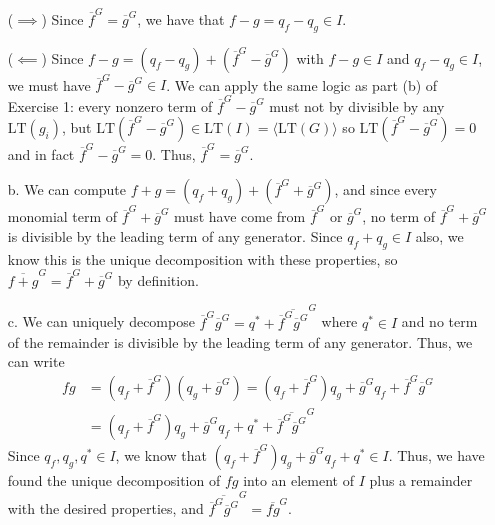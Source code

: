 \documentclass[12pt]{amsart}
\theoremstyle{definition}
\begin{document}
\begin{flushleft}
\begin{enumerate}
    ($\implies$) Since $\overline f^G = \overline g^G$, we have that $f-g=q_f-q_g \in I$.

    ($\impliedby$) Since $f-g = (q_f - q_g) +\left(\overline f^G - \overline g^G \right)$ with $f-g \in I$ and $q_f - q_g \in I$, we must have $\overline f^G - \overline g^G \in I$. We can apply the same logic as part (b) of Exercise 1: every nonzero term of $\overline f^G-\overline g^G$ must not by divisible by any $\text{LT}(g_i)$, but $\text{LT}\left(\overline f^G -\overline g^G \right) \in \text{LT}(I)=\langle \text{LT}(G)\rangle$ so $\text{LT}\left(\overline f^G -\overline g^G \right)=0$ and in fact $\overline f^G - \overline g^G = 0$. Thus, $\overline f^G = \overline g^G$.
    \item[b.] %
    We can compute $f+g=(q_f + q_g)+ \left(\overline f^G+\overline g^G\right)$, and since every monomial term of $\overline f^G + \overline g^G$ must have come from $\overline f^G$ or $\overline g^G$, no term of $\overline f^G + \overline g^G$ is divisible by the leading term of any generator. Since $q_f+q_g \in I$ also, we know this is the unique decomposition with these properties, so $\overline{f+g}^G = \overline f^G + \overline g^G$ by definition.
    \item[c.] We can uniquely decompose $\overline f^G \overline g^G = q^\ast + \overline{\overline f^G \overline g^G}^G$ where $q^\ast \in I$ and no term of the remainder is divisible by the leading term of any generator. 
    Thus, we can write \begin{align*}
    fg &= \left(q_f + \overline f^G\right)\left(q_g + \overline g^G\right) = \left(q_f + \overline f^G\right)q_g + \overline g^G q_f +\overline f ^G \overline g^G \\ &= \left(q_f + \overline f^G\right)q_g + \overline g^G q_f +q^\ast +\overline{\overline f ^G \overline g^G}^G \end{align*}
    Since $q_f,q_g,q^\ast \in I$, we know that $\left(q_f + \overline f^G\right)q_g + \overline g^G q_f +q^\ast \in I$. Thus, we have found the unique decomposition of $fg$ into an element of $I$ plus a remainder with the desired properties, and $\overline{\overline f^G \overline g^G}^G = \overline{fg}^G$.
\end{enumerate}


\end{flushleft}
\end{document}
